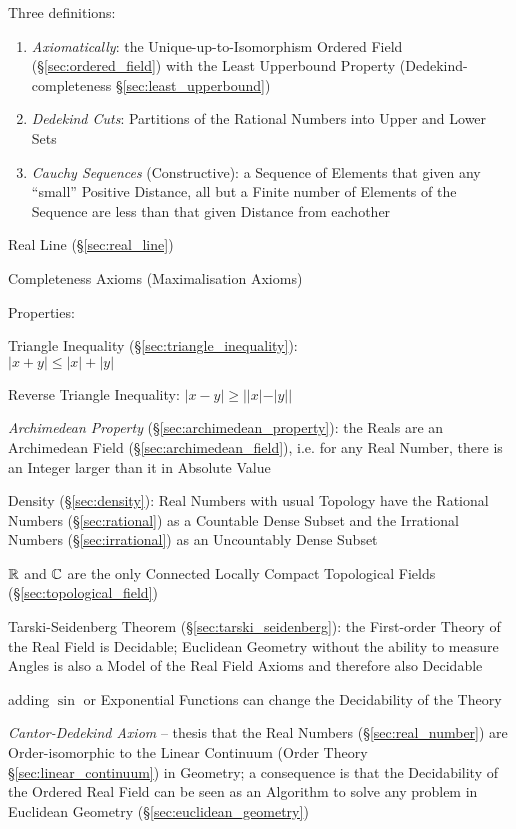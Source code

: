 Three definitions:
\begin{enumerate}
  \item \emph{Axiomatically}: the Unique-up-to-Isomorphism Ordered Field
    (\S\ref{sec:ordered_field}) with the Least Upperbound Property
    (Dedekind-completeness \S\ref{sec:least_upperbound})
  \item \emph{Dedekind Cuts}: Partitions of the Rational Numbers into
    Upper and Lower Sets
  \item \emph{Cauchy Sequences} (Constructive): a Sequence of Elements that
    given any ``small'' Positive Distance, all but a Finite number of Elements
    of the Sequence are less than that given Distance from eachother
\end{enumerate}

Real Line (\S\ref{sec:real_line})

Completeness Axioms (Maximalisation Axioms)

Properties:

Triangle Inequality (\S\ref{sec:triangle_inequality}):\\
$|x + y| \leq |x| + |y|$

Reverse Triangle Inequality: $|x - y| \geq ||x| - |y||$

\emph{Archimedean Property} (\S\ref{sec:archimedean_property}): the Reals are
an Archimedean Field (\S\ref{sec:archimedean_field}), i.e. for any Real Number,
there is an Integer larger than it in Absolute Value

Density (\S\ref{sec:density}): Real Numbers with usual Topology have the
Rational Numbers (\S\ref{sec:rational}) as a Countable Dense Subset and the
Irrational Numbers (\S\ref{sec:irrational}) as an Uncountably Dense Subset

$\mathbb{R}$ and $\mathbb{C}$ are the only Connected Locally Compact
Topological Fields (\S\ref{sec:topological_field})

Tarski-Seidenberg Theorem (\S\ref{sec:tarski_seidenberg}): the First-order
Theory of the Real Field is Decidable; Euclidean Geometry without the ability
to measure Angles is also a Model of the Real Field Axioms and therefore also
Decidable

adding $\sin$ or Exponential Functions can change the Decidability of the Theory

\emph{Cantor-Dedekind Axiom} -- thesis that the Real Numbers
(\S\ref{sec:real_number}) are Order-isomorphic to the Linear Continuum (Order
Theory \S\ref{sec:linear_continuum}) in Geometry; a consequence is that the
Decidability of the Ordered Real Field can be seen as an Algorithm to solve any
problem in Euclidean Geometry (\S\ref{sec:euclidean_geometry})



